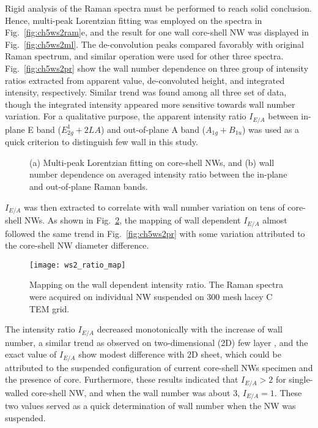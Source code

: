 Rigid analysis of the Raman spectra must be performed to reach solid conclusion. Hence, multi-peak Lorentzian fitting was employed on the spectra in Fig.~\ref{fig:ch5ws2ram}e, and the result for one wall  core-shell NW was displayed in Fig.~\ref{fig:ch5ws2ml}. The de-convolution peaks compared favorably with original Raman spectrum, and similar operation were used for other three spectra. Fig.~\ref{fig:ch5ws2pr} show the wall number dependence on three group of intensity ratios extracted from apparent value, de-convoluted height, and integrated intensity, respectively. Similar trend was found among all three set of data, though the integrated intensity appeared more sensitive towards wall number variation. For a qualitative purpose, the apparent intensity ratio $I_{E/A}$ between in-plane E band ($E_{2g}^1+2LA$) and out-of-plane A band ($A_{1g}+B_{1u}$) was used as a quick criterion to distinguish  few wall in this study. 
\begin{figure}[htb]
\centering
{}\hspace{0.04\textwidth}
\caption[Multi-peak Lorentzian fitting on core-shell NWs]{(a) Multi-peak Lorentzian fitting on core-shell NWs, and (b) wall number dependence on averaged intensity ratio between the in-plane and out-of-plane Raman bands.}
\label{fig:ch5ws2prl}
\end{figure}
$I_{E/A}$ was then extracted to correlate with wall number variation on tens of core-shell NWs. As shown in Fig.~\ref{fig:ch5ws2ramap}, the mapping of  wall dependent $I_{E/A}$ almost followed the same trend in Fig.~\ref{fig:ch5ws2pr} with some variation attributed to the core-shell NW diameter difference.
\begin{figure}[htb]
\centering
\texttt{[image: ws2\_ratio\_map]}
\caption[Mapping on the  wall dependent intensity ratio]{Mapping on the  wall dependent intensity ratio. The Raman spectra were acquired on individual NW suspended on 300 mesh lacey C TEM grid.}
\label{fig:ch5ws2ramap}
\end{figure}
The intensity ratio $I_{E/A}$ decreased monotonically with the increase of  wall number, a similar trend as observed on two-dimensional (2D) few layer ,\cite{Berkdemir2013} and the exact value of $I_{E/A}$ show modest difference with 2D sheet, which could be attributed to the suspended configuration of current core-shell NWs specimen and the presence of  core. Furthermore, these results indicated that $I_{E/A} > 2$ for single-walled  core-shell NW, and when the  wall number was about 3, $I_{E/A}=1$. These two values served as a quick determination of  wall number when the NW was suspended. 

